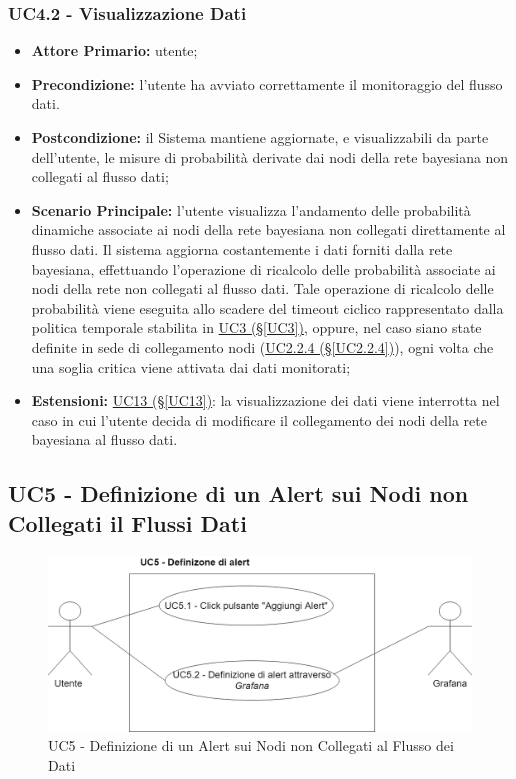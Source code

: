\subsubsection{UC4.2 - Visualizzazione Dati}\label{UC4.2}
\begin{itemize}
\item \textbf{Attore Primario:} utente;
\item \textbf{Precondizione:} l'utente ha avviato correttamente il monitoraggio del flusso dati.
\item \textbf{Postcondizione:} il Sistema mantiene aggiornate, e visualizzabili da parte dell'utente, le misure di probabilità derivate dai nodi della rete bayesiana non collegati al flusso dati;
\item \textbf{Scenario Principale:} l'utente visualizza l'andamento delle probabilità dinamiche associate ai nodi 			della rete bayesiana non collegati direttamente al flusso dati. Il sistema aggiorna costantemente i dati forniti dalla rete bayesiana, effettuando l'operazione di ricalcolo delle probabilità associate ai nodi della rete non collegati al flusso dati. Tale operazione di ricalcolo delle probabilità viene eseguita allo scadere del timeout ciclico rappresentato dalla politica temporale stabilita in \hyperref[UC3]{UC3 (§\ref*{UC3})}, oppure, nel caso siano state definite in sede di collegamento nodi (\hyperref[UC2.2.4]{UC2.2.4 (§\ref*{UC2.2.4})}), ogni volta che una soglia critica viene attivata dai dati monitorati;
\item \textbf{Estensioni:} \hyperref[UC13]{UC13 (§\ref*{UC13})}: la visualizzazione dei dati viene interrotta nel 			caso in cui l'utente decida di modificare il collegamento dei nodi della rete bayesiana al flusso dati.
\end{itemize}

\newpage

\subsection{UC5 - Definizione di un Alert sui Nodi non Collegati il Flussi Dati}\label{UC5}

\begin{figure}[H]
	\centering
	\includegraphics[scale=0.3]{./images/UC5.png}
	\caption{UC5 - Definizione di un Alert sui Nodi non Collegati al Flusso dei Dati}
\end{figure}

